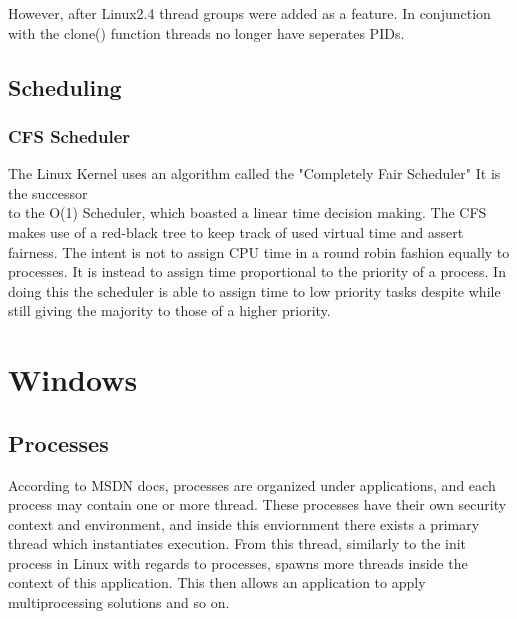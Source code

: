 \documentclass[letterpaper,10pt,notitlepage,fleqn]{article}
\begin{document}
However, after Linux2.4 thread groups were added as a feature\cite{ThreadAsProc}. In conjunction 
with the clone() function threads no longer have seperates PIDs. 


\subsection{Scheduling}



\subsubsection{CFS Scheduler}

The Linux Kernel uses an algorithm called the "Completely Fair Scheduler" It is the successor\\
to the O(1) Scheduler, which boasted a linear time decision making. The CFS makes use of a red-black
tree to keep track of used virtual time and assert fairness. The intent is not to assign CPU time
in a round robin fashion equally to processes. It is instead to assign time proportional to the
priority of a process\cite{LinuxSched}. In doing this the scheduler is able to assign time to low 
priority tasks despite while still giving the majority to those of a higher priority. 





\section{Windows}

\subsection{Processes}

According to MSDN docs\cite{MSProc}, processes are organized under applications, and each 
process may contain one or more thread. These processes have their own security context and
environment, and inside this enviornment there exists a primary thread which instantiates 
execution. From this thread, similarly to the init process in Linux with regards to processes, 
spawns more threads inside the context of this application. This then allows an application to 
apply multiprocessing solutions and so on. 
\end{document}

